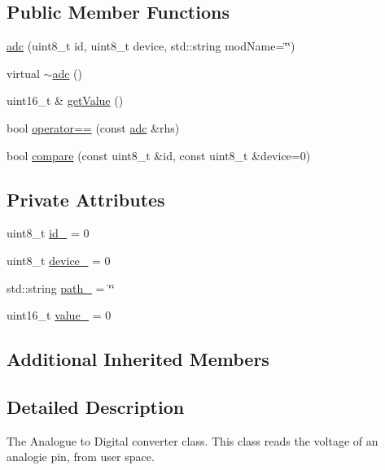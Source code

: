 \subsection*{Public Member Functions}
\begin{DoxyCompactItemize}
\item 
\hyperlink{classo_cpt_1_1protocol_1_1adc_aec27fd40080992220a7b641adcdfe9f9}{adc} (uint8\+\_\+t id, uint8\+\_\+t device, std\+::string mod\+Name=\char`\"{}\char`\"{})
\item 
virtual \hyperlink{classo_cpt_1_1protocol_1_1adc_ae61f97f81f6d76d5fc5fd783f49464ee}{$\sim$adc} ()
\item 
uint16\+\_\+t \& \hyperlink{classo_cpt_1_1protocol_1_1adc_a78a1abf9c5d72b7da8efea1be21e0a85}{get\+Value} ()
\item 
bool \hyperlink{classo_cpt_1_1protocol_1_1adc_afd7e7e1ab0855f53227a4fbf91449687}{operator==} (const \hyperlink{classo_cpt_1_1protocol_1_1adc}{adc} \&rhs)
\item 
bool \hyperlink{classo_cpt_1_1protocol_1_1adc_ae5ff90755d50ef617e9c00d704a88f52}{compare} (const uint8\+\_\+t \&id, const uint8\+\_\+t \&device=0)
\end{DoxyCompactItemize}
\subsection*{Private Attributes}
\begin{DoxyCompactItemize}
\item 
uint8\+\_\+t \hyperlink{classo_cpt_1_1protocol_1_1adc_a1ea5bd6df6c5163f98dd097796afddb7}{id\+\_\+} = 0
\item 
uint8\+\_\+t \hyperlink{classo_cpt_1_1protocol_1_1adc_a0781bbf803cff1a30fb79bc2118ee771}{device\+\_\+} = 0
\item 
std\+::string \hyperlink{classo_cpt_1_1protocol_1_1adc_a23481c789dd95444a3e9a19beb5b044e}{path\+\_\+} = \char`\"{}\char`\"{}
\item 
uint16\+\_\+t \hyperlink{classo_cpt_1_1protocol_1_1adc_a79ed77ed852cbe9c1b23e9c3601ffdb7}{value\+\_\+} = 0
\end{DoxyCompactItemize}
\subsection*{Additional Inherited Members}


\subsection{Detailed Description}
The Analogue to Digital converter class. This class reads the voltage of an analogie pin, from user space. 

